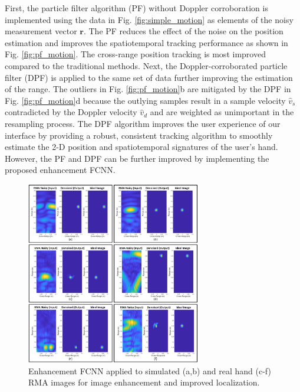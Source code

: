 \documentclass[10pt,journal,final]{IEEEtran}
\begin{document}
First, the particle filter algorithm (PF) without Doppler corroboration is implemented using the data in Fig. \ref{fig:simple_motion} as elements of the noisy measurement vector $\mathbf{r}$. 
The PF reduces the effect of the noise on the position estimation and improves the spatiotemporal tracking performance as shown in Fig. \ref{fig:pf_motion}.
The cross-range position tracking is most improved compared to the traditional methods.
Next, the Doppler-corroborated particle filter (DPF) is applied to the same set of data further improving the estimation of the range. 
The outliers in Fig. \ref{fig:pf_motion}b are mitigated by the DPF in Fig. \ref{fig:pf_motion}d because the outlying samples result in a sample velocity $\hat{v}_s$ contradicted by the Doppler velocity $\hat{v}_d$ and are weighted as unimportant in the resampling process.
The DPF algorithm improves the user experience of our interface by providing a robust, consistent tracking algorithm to smoothly estimate the 2-D position and spatiotemporal signatures of the user's hand.
However, the PF and DPF can be further improved by implementing the proposed enhancement FCNN.

\begin{figure}[h]
	\centering
	\includegraphics[width=3in]{smith11.jpg}
	\caption{Enhancement FCNN applied to simulated (a,b) and real hand (c-f) RMA images for image enhancement and improved localization.}
	\label{fig:fcnn_enhancement_demo}
\end{figure}
\end{document}

